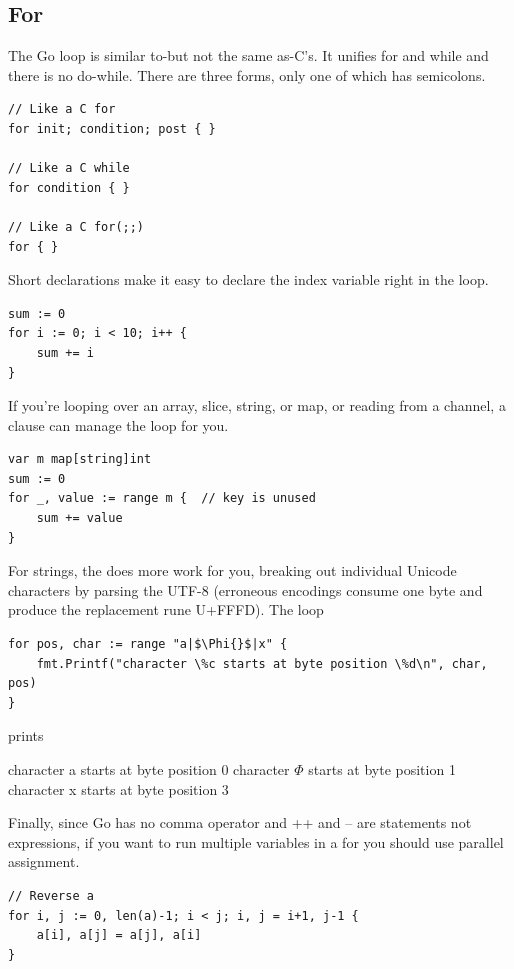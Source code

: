 \subsection{For}
The Go  loop is similar to-but not the same as-C's. It unifies for
and while and there is no do-while. There are three forms, only one of
which has semicolons.
\begin{lstlisting}
// Like a C for
for init; condition; post { }

// Like a C while
for condition { }

// Like a C for(;;)
for { }
\end{lstlisting}
Short declarations make it easy to declare the index variable right in the loop.
\begin{lstlisting}
sum := 0
for i := 0; i < 10; i++ {
    sum += i
}
\end{lstlisting}
If you're looping over an array, slice, string, or map, or reading from
a channel, a  clause can manage the loop for you.
\begin{lstlisting}
var m map[string]int
sum := 0
for _, value := range m {  // key is unused
    sum += value
}
\end{lstlisting}
For strings, the  does more work for you, breaking out individual
Unicode characters by parsing the UTF-8 (erroneous encodings consume one
byte and produce the replacement rune U+FFFD). The loop

\begin{lstlisting}
for pos, char := range "a|$\Phi{}$|x" {
    fmt.Printf("character \%c starts at byte position \%d\n", char, pos)
}
\end{lstlisting}
prints
\begin{display}
character a starts at byte position 0
character \begin{math}\Phi\end{math} starts at byte position 1
character x starts at byte position 3
\end{display}
Finally, since Go has no comma operator and ++ and -- are statements not
expressions, if you want to run multiple variables in a for you should
use parallel assignment.
\begin{lstlisting}
// Reverse a
for i, j := 0, len(a)-1; i < j; i, j = i+1, j-1 {
    a[i], a[j] = a[j], a[i]
}
\end{lstlisting}

